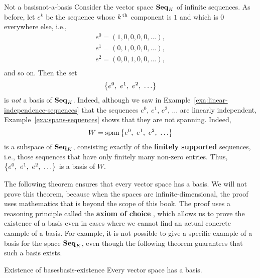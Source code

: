 \begin{example}{Not a basis}{not-a-basis}
  Consider the vector space $\mathbf{Seq}_K$ of infinite sequences. As before,
  let $e^k$ be the sequence whose $k^{\,\rm th}$ component is $1$ and which is
  $0$ everywhere else, i.e.,
    \begin{equation*}
    \begin{array}{l}
      e^0 = (1,0,0,0,0,\ldots), \\
      e^1 = (0,1,0,0,0,\ldots), \\
      e^2 = (0,0,1,0,0,\ldots), \\
    \end{array}
  \end{equation*}
  and so on. Then the set
  \begin{equation*}
    \left\{e^0,~ e^1,~ e^2,~ \ldots\right\}
  \end{equation*}
  is \textit{not} a basis of $\mathbf{Seq}_K$. Indeed, although we saw in
  Example~\ref{exa:linear-independence-sequences} that the sequences
  $e^0$, $e^1$, $e^2$, $\ldots$ are linearly independent,
  Example~\ref{exa:spans-sequences} shows that they are not spanning.
  Indeed,
  \begin{equation*}
    W = \sspan\set{e^0,~ e^1,~ e^2,~ \ldots}
  \end{equation*}
  is a subspace of $\mathbf{Seq}_K$, consisting exactly of the
  \textbf{finitely supported}%
   sequences, i.e., those sequences
  that have only finitely many non-zero entries. Thus, $\left\{e^0,~ e^1,~
    e^2,~ \ldots\right\}$ is a basis of $W$.
\end{example}

The following theorem ensures that every vector space has a basis.  We
will not prove this theorem, because when the spaces are
infinite-dimensional, the proof uses mathematics that is beyond the
scope of this book. The proof uses a reasoning principle called the
\textbf{axiom of choice}%
, which allows us to prove the existence of a
basis even in cases where we cannot find an actual concrete example of
a basis.  For example, it is not possible to give a specific example
of a basis for the space $\mathbf{Seq}_K$, even though the following theorem
guarantees that such a basis exists.

\begin{theorem}{Existence of bases}{basis-existence}
  Every vector space has a basis.
\end{theorem}

